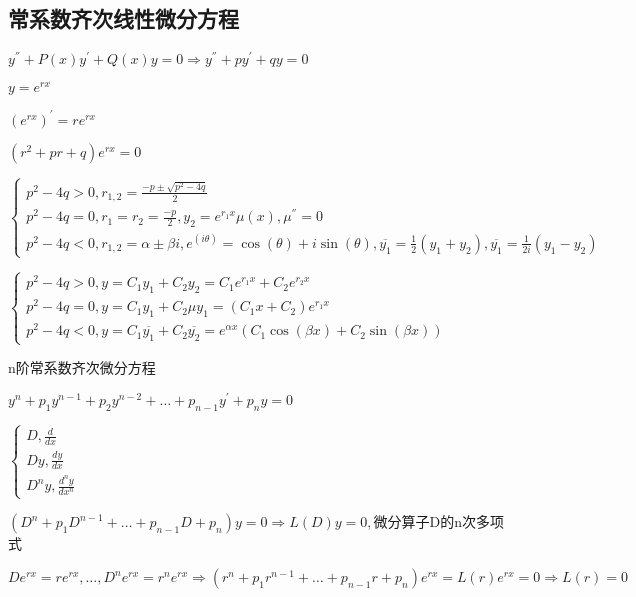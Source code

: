 \documentclass[UTF8]{ctexart}
\begin{document}
\subsection{常系数齐次线性微分方程}
$y^{''}+P\left(x\right)y^{'}+Q\left(x\right)y=0\Rightarrow
y^{''}+py^{'}+qy=0$\par
$y=e^{rx}$\par
$(e^{rx})^{'}=re^{rx}$\par
$\left(r^2+pr+q\right)e^{rx}=0$\par

$\left\{
    \begin{array}{ll}
        p^2-4q>0,r_{1,2}=\frac{-p \pm \sqrt{p^2-4q} }{2}\\
        p^2-4q=0,r_1=r_2=\frac{-p }{2},
            y_2=e^{r_1x}\mu\left(x\right),\mu^{''}=0\\
        p^2-4q<0,r_{1,2}=\alpha\pm \beta i,
            e^{(i\theta)}=\cos\left(\theta\right)+i\sin \left(\theta\right),
            \overline{y_1} =\frac{1}{2}\left(y_1+y_2\right),
            \overline{y_1} =\frac{1}{2i}\left(y_1-y_2\right)        
    \end{array}
\right.
$\par
$\left\{
    \begin{array}{ll}
        p^2-4q>0, y=C_1y_1+C_2y_2=C_1e^{r_1x}+C_2e^{r_2x}\\
        p^2-4q=0, y=C_1y_1+C_2\mu y_1=\left(C_1x+C_2\right)e^{r_1x}\\
        p^2-4q<0, y=C_1\overline{y_1}+C_2\overline{y_2}=e^{\alpha x}\left(C_1\cos\left(\beta x \right) + C_2\sin\left(\beta x \right) \right)         
    \end{array}
\right.
$\par
n阶常系数齐次微分方程\par
$y^{n}+p_1y^{n-1}+p_2y^{n-2}+\dots+p_{n-1}y^{'}+p_ny=0$\par
$\left\{
    \begin{array}{ll}
        D,\frac{d}{dx}\\
        Dy,\frac{dy}{dx}\\
        D^ny,\frac{d^ny}{dx^n}
    \end{array}
\right.$\par

$\left(D^n+p_1D^{n-1}+\dots+p_{n-1}D+p_n \right)y=0\Rightarrow
L\left(D\right)y=0,
$微分算子D的n次多项式\par
$De^{rx}=re^{rx},\dots,D^ne^{rx}=r^ne^{rx}\Rightarrow
\left(r^n+p_1r^{n-1}+\dots+p_{n-1}r+p_n \right)e^{rx}=L(r)e^{rx}=0\Rightarrow L(r)=0
$\par
\end{document}
